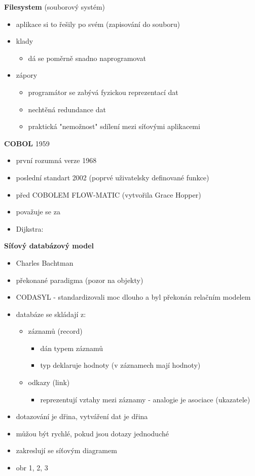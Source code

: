 \documentclass[10pt, a4paper, titlepage]{article}
\theoremstyle{note}
\begin{document}
\textbf{Filesystem} (souborový systém)
\begin{itemize}
	\item aplikace si to řešily po svém (zapisování do souboru)
	\item klady
	\begin{itemize}
		\item dá se poměrně snadno naprogramovat
	\end{itemize}		 
	\item zápory
	\begin{itemize}
		\item programátor se zabývá fyzickou reprezentací dat
		\item nechtěná redundance dat
		\item praktická "nemožnost" sdílení mezi síťovými aplikacemi
	\end{itemize}
\end{itemize}

\textbf{COBOL} 1959
\begin{itemize}
	\item první rozumná verze 1968
	\item poslední standart 2002 (poprvé uživatelsky definované funkce)
	\item před COBOLEM FLOW-MATIC (vytvořila Grace Hopper)
	\item považuje se za 
	\item Dijkstra: 
\end{itemize}

\textbf{Síťový databázový model}
\begin{itemize}
	\item Charles Bachtman
	\item překonané paradigma (pozor na objekty)
	\item CODASYL - standardizovali moc dlouho a byl překonán relačním modelem
	\item databáze se skládají z:
	\begin{itemize}
		\item záznamů (record)
		\begin{itemize}
			\item dán typem záznamů
			\item typ deklaruje hodnoty (v záznamech mají hodnoty)
		\end{itemize}
		\item odkazy (link)
		\begin{itemize}
			\item reprezentují vztahy mezi záznamy - analogie je asociace (ukazatele)
		\end{itemize}
	\end{itemize}
	\item dotazování je dřina, vytváření dat je dřina
	\item můžou být rychlé, pokud jsou dotazy jednoduché
	\item zakreslují se síťovým diagramem
	\item  obr 1, 2, 3
\end{itemize}
\end{document}
